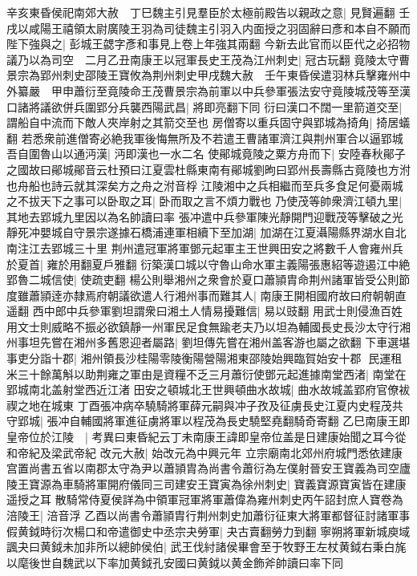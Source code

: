 辛亥東昏侯祀南郊大赦　丁巳魏主引見羣臣於太極前殿告以親政之意|{
	見賢遍翻}
壬戌以咸陽王禧領太尉廣陵王羽為司徒魏主引羽入内面授之羽固辭曰彥和本自不願而陛下強與之|{
	彭城王勰字彥和事見上卷上年強其兩翻}
今新去此官而以臣代之必招物議乃以為司空　二月乙丑南康王以冠軍長史王茂為江州刺史|{
	冠古玩翻}
竟陵太守曹景宗為郢州刺史邵陵王寶攸為荆州刺史甲戌魏大赦　壬午東昏侯遣羽林兵擊雍州中外纂嚴　甲申蕭衍至竟陵命王茂曹景宗為前軍以中兵參軍張法安守竟陵城茂等至漢口諸將議欲併兵圍郢分兵襲西陽武昌|{
	將即亮翻下同}
衍曰漢口不闊一里箭道交至|{
	謂船自中流而下敵人夾岸射之其箭交至也}
房僧寄以重兵固守與郢城為掎角|{
	掎居蟻翻}
若悉衆前進僧寄必絶我軍後悔無所及不若遣王曹諸軍濟江與荆州軍合以逼郢城吾自圍魯山以通沔漢|{
	沔即漢也一水二名}
使鄖城竟陵之粟方舟而下|{
	安陸春秋鄖子之國故曰鄖城鄖音云杜預曰江夏雲杜縣東南有鄖城劉昫曰郢州長壽縣古竟陵也方泭也舟船也詩云就其深矣方之舟之泭音桴}
江陵湘中之兵相繼而至兵多食足何憂兩城之不拔天下之事可以卧取之耳|{
	卧而取之言不煩力戰也}
乃使茂等帥衆濟江頓九里|{
	其地去郢城九里因以為名帥讀曰率}
張冲遣中兵參軍陳光靜開門迎戰茂等擊破之光靜死冲嬰城自守景宗遂據石橋浦連軍相續下至加湖|{
	加湖在江夏灄陽縣界湖水自北南注江去郢城三十里}
荆州遣冠軍將軍鄧元起軍主王世興田安之將數千人會雍州兵於夏首|{
	雍於用翻夏戶雅翻}
衍築漢口城以守魯山命水軍主義陽張惠紹等遊遏江中絶郢魯二城信使|{
	使疏吏翻}
楊公則舉湘州之衆會於夏口蕭頴胄命荆州諸軍皆受公則節度雖蕭頴逹亦隸焉府朝議欲遣人行湘州事而難其人|{
	南康王開相國府故曰府朝朝直遥翻}
西中郎中兵參軍劉坦謂衆曰湘土人情易擾難信|{
	易以豉翻}
用武士則侵漁百姓用文士則威略不振必欲鎮靜一州軍民足食無踰老夫乃以坦為輔國長史長沙太守行湘州事坦先嘗在湘州多舊恩迎者屬路|{
	劉坦傳先嘗在湘州盖客游也屬之欲翻}
下車選堪事吏分詣十郡|{
	湘州領長沙桂陽零陵衡陽營陽湘東邵陵始興臨賀始安十郡}
民運租米三十餘萬斛以助荆雍之軍由是資糧不乏三月蕭衍使鄧元起進據南堂西渚|{
	南堂在郢城南北盖射堂西近江渚}
田安之頓城北王世興頓曲水故城|{
	曲水故城盖郢府官僚袚禊之地在城東}
丁酉張冲病卒驍騎將軍薛元嗣與冲子孜及征虜長史江夏内史程茂共守郢城|{
	張冲自輔國將軍進征虜將軍以程茂為長史驍堅堯翻騎奇寄翻}
乙巳南康王即皇帝位於江陵　|{
	考異曰東昏紀云丁未南康王諱即皇帝位盖是日建康始聞之耳今從和帝紀及梁武帝紀}
改元大赦|{
	始改元為中興元年}
立宗廟南北郊州府城門悉依建康宫置尚書五省以南郡太守為尹以蕭頴胄為尚書令蕭衍為左僕射晉安王寶義為司空廬陵王寶源為車騎將軍開府儀同三司建安王寶寅為徐州刺史|{
	寶義寶源寶寅皆在建康遥授之耳}
散騎常侍夏侯詳為中領軍冠軍將軍蕭偉為雍州刺史丙午詔封庶人寶卷為涪陵王|{
	涪音浮}
乙酉以尚書令蕭頴胄行荆州刺史加蕭衍征東大將軍都督征討諸軍事假黄鉞時衍次楊口和帝遣御史中丞宗夬勞軍|{
	夬古賣翻勞力到翻}
寧朔將軍新城庾域諷夬曰黄鉞未加非所以總帥侯伯|{
	武王伐紂諸侯畢會至于牧野王左杖黄鉞右秉白旄以麾後世自魏武以下率加黄鉞孔安國曰黄鉞以黄金飾斧帥讀曰率下同}
